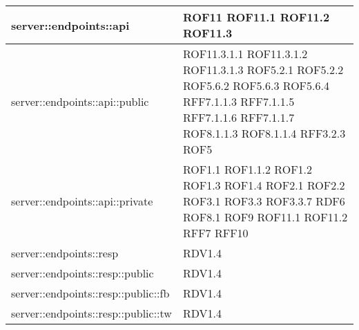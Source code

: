 \begin{center}
\begin{longtable}{| p{9cm} | p{4cm} |}
\hline
server::endpoints::api  &  ROF11 \newline ROF11.1 \newline ROF11.2 \newline ROF11.3 \\
\hline
server::endpoints::api::public  & \newline ROF11.3.1.1 \newline ROF11.3.1.2 \newline ROF11.3.1.3 \newline ROF5.2.1 \newline ROF5.2.2 \newline ROF5.6.2 \newline ROF5.6.3 \newline ROF5.6.4 \newline RFF7.1.1.3 \newline RFF7.1.1.5 \newline RFF7.1.1.6 \newline RFF7.1.1.7 \newline ROF8.1.1.3 \newline  ROF8.1.1.4 \newline RFF3.2.3 \newline ROF5 \\
\hline
server::endpoints::api::private  &  ROF1.1 \newline ROF1.1.2 \newline ROF1.2 \newline ROF1.3 \newline ROF1.4 \newline ROF2.1 \newline ROF2.2 \newline ROF3.1 \newline ROF3.3 \newline ROF3.3.7 \newline RDF6 \newline ROF8.1 \newline ROF9 \newline ROF11.1 \newline ROF11.2 \newline RFF7 \newline RFF10 \\
\hline
server::endpoints::resp  &  RDV1.4 \\
\hline
server::endpoints::resp::public  &  RDV1.4 \\
\hline
server::endpoints::resp::public::fb  &  RDV1.4 \\
\hline
server::endpoints::resp::public::tw  &  RDV1.4 \\

\end{longtable}
\end{center}
